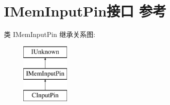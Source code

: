 \hypertarget{interface_i_mem_input_pin}{}\section{I\+Mem\+Input\+Pin接口 参考}
\label{interface_i_mem_input_pin}
类 I\+Mem\+Input\+Pin 继承关系图\+:\begin{figure}[H]
\begin{center}
\leavevmode
\includegraphics[height=3.000000cm]{interface_i_mem_input_pin}
\end{center}
\end{figure}
